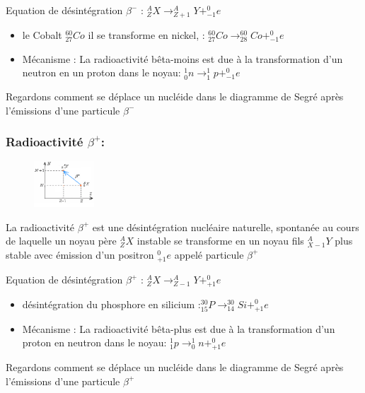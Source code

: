 \documentclass[12pt]{article}
\begin{document}
Equation de désintégration $\beta^-$ : $_Z^AX \rightarrow _{Z+1 }^{A}Y + _{-1}^{0}e$


\begin{itemize}
	\item le Cobalt $_{27}^{60}Co$ il se transforme en nickel, : $_{27}^{60}Co \rightarrow _{28}^{60}Co + _{-1}^{0}e$
	\item Mécanisme : La radioactivité bêta-moins est due à la transformation d'un neutron en un proton dans le noyau: $_0^1n \rightarrow _1^1p + _{-1}^0e$


\end{itemize}
Regardons comment se déplace un nucléide dans le diagramme de Segré après l'émissions d'une particule $\beta^-$



\subsubsection{ Radioactivité $\beta^ +$: }

  \begin{figure}
	\includegraphics[width=0.2\textwidth]{./img/nuc06.png}
\end{figure}


La radioactivité $\beta^+$ est une désintégration nucléaire naturelle, spontanée au cours de laquelle un noyau père  $_{Z}^{A}X$ instable se transforme en un noyau fils            $_{X-1}^{A}Y$ plus stable avec émission d'un positron $_{+1}^{0}e$ appelé particule $\beta^+$

Equation de désintégration $\beta^+$ : $_Z^AX \rightarrow _{Z-1 }^{A}Y + _{+1}^{0}e$


\begin{itemize}
	\item désintégration du phosphore en silicium :$_{15}^{30}P \rightarrow _{14}^{30}Si + _{+1}^0e$
	\item Mécanisme : La radioactivité bêta-plus est due à la transformation d'un proton en neutron dans le noyau: $_1^1p \rightarrow _0^1n + _{+1}^0e$


\end{itemize}
Regardons comment se déplace un nucléide dans le diagramme de Segré après l'émissions d'une particule $\beta^+$
\end{document}
